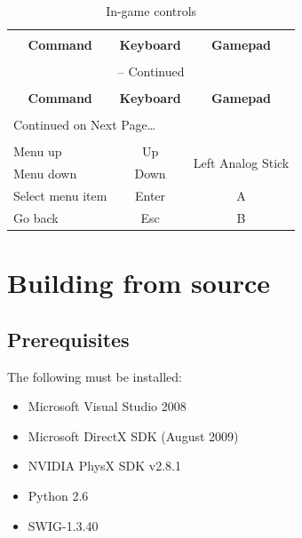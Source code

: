 \documentclass[11pt]{article}
\begin{document}
\begin{center}
\begin{longtable}{lcc}
\caption{In-game controls} \label{ingame-controls-table} \\

\hline \hline \\[-2ex]
   \multicolumn{1}{c}{\textbf{Command}} &
   \multicolumn{1}{c}{\textbf{Keyboard}} &
   \multicolumn{1}{c}{\textbf{Gamepad}} \\[0.5ex] \hline
   \\[-1.8ex]
\endfirsthead

\multicolumn{3}{c}{{\tablename} \thetable{} -- Continued} \\[0.5ex]
  \hline \hline \\[-2ex]
  \multicolumn{1}{c}{\textbf{Command}} &
  \multicolumn{1}{c}{\textbf{Keyboard}} &
  \multicolumn{1}{c}{\textbf{Gamepad}} \\[0.5ex] \hline
  \\[-1.8ex]
\endhead

  \multicolumn{3}{l}{{Continued on Next Page\ldots}} \\
\endfoot

  \\[-1.8ex] \hline \hline
\endlastfoot

Menu up & Up & \multirow{2}{*}{Left Analog Stick}\\ 
Menu down & Down \\ 
Select menu item & Enter & A \\ 
Go back & Esc & B \\
\end{longtable}
\end{center}


\section{Building from source}
\label{building-from-source}

\subsection{Prerequisites}

The following must be installed:
  
\begin{itemize}
  \item Microsoft Visual Studio 2008
  \item Microsoft DirectX SDK (August 2009)
  \item NVIDIA PhysX SDK v2.8.1
  \item Python 2.6
  \item SWIG-1.3.40
\end{itemize}  
  
\end{document}
